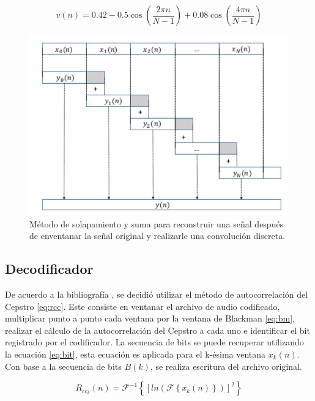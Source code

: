 \documentclass[conference]{IEEEtran}
\begin{document}
\begin{equation}
v(n)=0.42 - 0.5 \cos \left(  \frac{2\pi n}{N-1}\right) + 0.08 \cos \left(  \frac{4\pi n}{N-1}\right)
\label{eq:bm}
\end{equation}

\begin{figure}[h]
\centering
\includegraphics[scale=0.6]{solapadd.pdf}
\caption{Método de solapamiento y suma para reconstruir una señal después de enventanar la señal original y realizarle una convolución discreta.}
\label{fig:solapadd}
\end{figure}

\subsection{Decodificador}
De acuerdo a la bibliografía \cite{IEEEhowto:datahiding2}, se decidió utilizar el método de autocorrelación del Cepstro \eqref{eq:rcc}. Este consiste en ventanar el archivo de audio codificado, multiplicar punto a punto cada ventana por la ventana de Blackman \eqref{eq:bm}, realizar el cálculo de la autocorrelación del Cepstro a cada uno e identificar el bit registrado por el codificador. La secuencia de bits se puede recuperar utilizando la ecuación \eqref{eq:bit}, esta ecuación es aplicada para el k-ésima ventana $x_k(n)$. Con base a la secuencia de bits $B(k)$, se realiza escritura del archivo original.

\begin{equation}
R_{cc_k}(n) = \mathscr{F}^{-1} \left \{  [ln( \mathscr{F} \left \{ x_k(n) \right \} )]^2 \right \}
\label{eq:rcc}
\end{equation}
\end{document}
